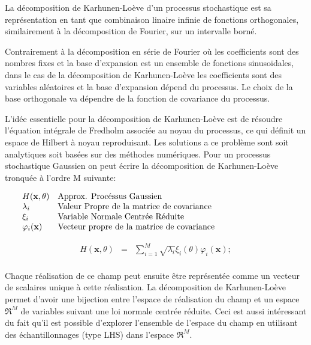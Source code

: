 \documentclass[a4paper,10pt]{article}
\begin{document}
	 La décomposition de Karhunen-Loève d'un processus stochastique est sa représentation en tant que combinaison linaire infinie de fonctions orthogonales, similairement à la décomposition de Fourier, sur un intervalle borné. \par
	 Contrairement à la décomposition en série de Fourier où les coefficients sont des nombres fixes et la base d'expansion est un ensemble de fonctions sinusoïdales, dans le cas de la décomposition de Karhunen-Loève les coefficients sont des variables aléatoires et la base d'expansion dépend du processus. Le choix de la base orthogonale va dépendre de la fonction de covariance du processus. \par
	 L'idée essentielle pour la décomposition de Karhunen-Loève est de résoudre l'équation intégrale de Fredholm associée au noyau du processus, ce qui définit un espace de Hilbert à noyau reproduisant. Les solutions a ce problème sont soit analytiques soit basées sur des méthodes numériques. Pour un processus stochastique Gaussien on peut écrire la décomposition de Karhunen-Loève tronquée à l'ordre M suivante:
	 
   \[
      \begin{array}{lp{0.8\linewidth}}
         H(\textbf{x}, \theta) & Approx. Procéssus Gaussien \\
         \lambda_{i}          & Valeur Propre de la matrice de covariance \\
         \xi_{i}             & Variable Normale Centrée Réduite \\
         \varphi_{i}(\textbf{x}) & Vecteur propre de la matrice de covariance
      \end{array}
   \]

   \begin{eqnarray}
H(\textbf{x}, \theta) & = & \sum_{i=1}^{M}\sqrt{\lambda_{i}}\xi_{i}(\theta)\varphi_{i}(\textbf{x});
   \end{eqnarray}\\

Chaque réalisation de ce champ peut ensuite être représentée comme un vecteur de scalaires unique à cette réalisation. La décomposition de Karhunen-Loève permet d'avoir une bijection entre l'espace de réalisation du champ et un espace $\Re^{M}$ de variables suivant une loi normale centrée réduite. Ceci est aussi intéressant du fait qu'il est possible d'explorer l’ensemble de l'espace du champ en utilisant des échantillonnages (type LHS) dans l'espace $\Re^{M}$. \par
\end{document}
